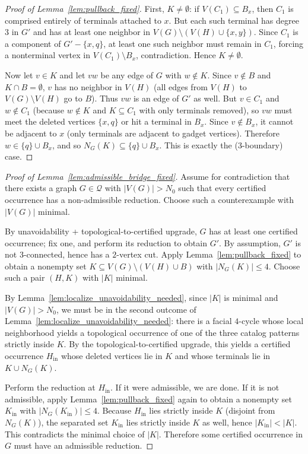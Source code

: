 \begin{proof}[Proof of Lemma~\ref{lem:pullback_fixed}]
First, $K\neq\emptyset$: if $V(C_1)\subseteq B_x$, then $C_1$ is comprised entirely of terminals attached to $x$.
But each such terminal has degree $3$ in $G'$ and has at least one neighbor in $V(G)\setminus (V(H)\cup\{x,y\})$.
Since $C_1$ is a component of $G'-\{x,q\}$, at least one such neighbor must remain in $C_1$, forcing a nonterminal vertex in $V(C_1)\setminus B_x$, contradiction.
Hence $K\neq\emptyset$.

Now let $v\in K$ and let $vw$ be any edge of $G$ with $w\notin K$.
Since $v\notin B$ and $K\cap B=\emptyset$, $v$ has no neighbor in $V(H)$ (all edges from $V(H)$ to $V(G)\setminus V(H)$ go to $B$).
Thus $vw$ is an edge of $G'$ as well.
But $v\in C_1$ and $w\notin C_1$ (because $w\notin K$ and $K\subseteq C_1$ with only terminals removed), so $vw$ must meet the deleted vertices $\{x,q\}$ or hit a terminal in $B_x$.
Since $v\notin B_x$, it cannot be adjacent to $x$ (only terminals are adjacent to gadget vertices).
Therefore $w\in \{q\}\cup B_x$, and so $N_G(K)\subseteq \{q\}\cup B_x$.
This is exactly the (3-boundary) case.
\end{proof}

\begin{proof}[Proof of Lemma~\ref{lem:admissible_bridge_fixed}]
Assume for contradiction that there exists a graph $G\in\mathcal Q$ with $|V(G)|>N_0$ such that every certified occurrence has a non-admissible reduction.
Choose such a counterexample with $|V(G)|$ minimal.

By unavoidability + topological-to-certified upgrade, $G$ has at least one certified occurrence; fix one, and perform its reduction to obtain $G'$.
By assumption, $G'$ is not $3$-connected, hence has a $2$-vertex cut.
Apply Lemma~\ref{lem:pullback_fixed} to obtain a nonempty set $K\subseteq V(G)\setminus (V(H)\cup B)$ with $|N_G(K)|\le 4$.
Choose such a pair $(H,K)$ with $|K|$ minimal.

By Lemma~\ref{lem:localize_unavoidability_needed}, since $|K|$ is minimal and $|V(G)|>N_0$, we must be in the second outcome of Lemma~\ref{lem:localize_unavoidability_needed}:
there is a facial $4$-cycle whose local neighborhood yields a topological occurrence of one of the three catalog patterns strictly inside $K$.
By the topological-to-certified upgrade, this yields a certified occurrence $H_{\mathrm{in}}$ whose deleted vertices lie in $K$ and whose terminals lie in $K\cup N_G(K)$.

Perform the reduction at $H_{\mathrm{in}}$. If it were admissible, we are done.
If it is not admissible, apply Lemma~\ref{lem:pullback_fixed} again to obtain a nonempty set $K_{\mathrm{in}}$ with $|N_G(K_{\mathrm{in}})|\le 4$.
Because $H_{\mathrm{in}}$ lies strictly inside $K$ (disjoint from $N_G(K)$), the separated set $K_{\mathrm{in}}$ lies strictly inside $K$ as well, hence $|K_{\mathrm{in}}|<|K|$.
This contradicts the minimal choice of $|K|$.
Therefore some certified occurrence in $G$ must have an admissible reduction.
\end{proof}

